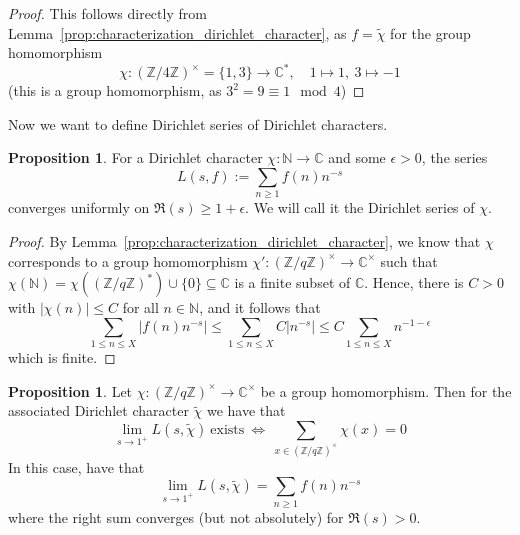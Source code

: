 \documentclass{scrartcl}
\newcommand{\N}{\mathbb{N}}
\newcommand{\Z}{\mathbb{Z}}
\newcommand{\C}{\mathbb{C}}
\newcommand{\units}{\times}
\theoremstyle{definition}
\newtheorem{proposition}[definition]{Proposition}
\begin{document}
\begin{proof}
    This follows directly from Lemma~\ref{prop:characterization_dirichlet_character}, as $f = \tilde{\chi}$ for the group homomorphism
    \begin{equation*}
        \chi: (\Z/4\Z)^\units = \{ 1, 3 \} \to \C^*, \quad 1 \mapsto 1, \ 3 \mapsto -1
    \end{equation*}
    (this is a group homomorphism, as $3^2 = 9 \equiv 1 \mod 4$)
\end{proof}
Now we want to define Dirichlet series of Dirichlet characters.
\begin{proposition}
    For a Dirichlet character $\chi: \N \to \C$ and some $\epsilon > 0$, the series
    \begin{equation*}
        L(s, f) := \sum_{n \geq 1} f(n) n^{-s}
    \end{equation*}
    converges uniformly on $\Re(s) \geq 1 + \epsilon$.
    We will call it the Dirichlet series of $\chi$.
\end{proposition}
\begin{proof}
    By Lemma~\ref{prop:characterization_dirichlet_character}, we know that $\chi$ corresponds to a group homomorphism $\chi': (\Z/q\Z)^\units \to \C^\units$ such that $\chi(\N) = \chi((\Z/q\Z)^*) \cup \{ 0 \} \subseteq \C$ is a finite subset of $\C$.
    Hence, there is $C > 0$ with $|\chi(n)| \leq C$ for all $n \in \N$, and it follows that
    \begin{equation*}
        \sum_{1 \leq n \leq X} \left| f(n) n^{-s} \right| \leq \sum_{1 \leq n \leq X} C \left| n^{-s} \right| \leq C \sum_{1 \leq n \leq X} n^{-1 - \epsilon}
    \end{equation*}
    which is finite.
\end{proof}
\begin{proposition}
    \label{prop:dirichlet_series_at_one}
    Let $\chi: (\Z/q\Z)^\units \to \C^\units$ be a group homomorphism. Then for the associated Dirichlet character $\tilde{\chi}$ we have that
    \begin{equation*}
        \lim_{s \to 1^+} L(s, \tilde{\chi}) \ \text{exists} \ \Leftrightarrow \ \sum_{x \in (\Z/q\Z)^\units} \chi(x) = 0
    \end{equation*}
    In this case, have that
    \begin{equation*}
        \lim_{s \to 1^+} L(s, \tilde{\chi}) = \sum_{n \geq 1} f(n) n^{-s}
    \end{equation*}
    where the right sum converges (but not absolutely) for $\Re(s) > 0$.
\end{proposition}
\end{document}
